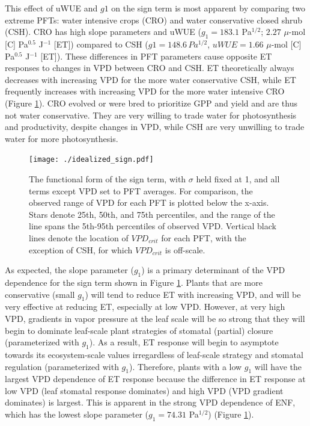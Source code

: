 \documentclass[draft,linenumbers]{agujournal}
\begin{document}
This effect of uWUE and $g1$ on the sign term is most apparent by comparing two extreme PFTs: water intensive crops (CRO) and water conservative closed shrub (CSH). CRO has high slope parameters and uWUE ($g_1 = 183.1$ Pa$^{1/2}$; $2.27$ $\mu$-mol [C] Pa$^{0.5}$ J$^{-1}$ [ET]) compared to CSH ($g1 = 148.6 \, Pa^{1/2}$, $uWUE=1.66$ $\mu$-mol [C] Pa$^{0.5}$ J$^{-1}$ [ET]). These differences in PFT parameters cause opposite ET responses to changes in VPD between CRO and CSH. ET theoretically always decreases with increasing VPD for the more water conservative CSH, while ET frequently  increases with increasing VPD for the more water intensive CRO (Figure \ref{idealized_sign}). CRO evolved or were bred to prioritize GPP and yield and are thus not water conservative. They are very willing to trade water for photosynthesis and productivity, despite changes in VPD, while CSH are very unwilling to trade water for more photosynthesis.

\begin{figure}
\centering
\texttt{[image: ./idealized\_sign.pdf]}
\caption{The functional form of the sign term, with $\sigma$ held fixed at 1, and all terms except VPD set to PFT averages. For comparison, the observed range of VPD for each PFT is plotted below the x-axis. Stars denote 25th, 50th, and 75th percentiles, and the range of the line spans the 5th-95th percentiles of observed VPD. Vertical black lines denote the location of $VPD_{crit}$ for each PFT, with the exception of CSH, for which $VPD_{crit}$ is off-scale.}
\label{idealized_sign}
\end{figure}


As expected, the slope parameter ($g_1$) is a primary determinant of the VPD dependence for the sign term shown in Figure \ref{idealized_sign}. Plants that are more conservative (small $g_1$) will tend to reduce ET with increasing VPD, and will be very effective at reducing ET, especially at low VPD. However, at very high VPD, gradients in vapor pressure at the leaf scale will be so strong that they will begin to dominate leaf-scale plant strategies of stomatal (partial) closure (parameterized with $g_1$). As a result, ET response will begin to asymptote towards its ecosystem-scale values irregardless of leaf-scale strategy and stomatal regulation (parameterized with $g_1$). Therefore, plants with a low $g_1$ will have the largest VPD dependence of ET response because the difference in ET response at low VPD (leaf stomatal response dominates) and high VPD (VPD gradient dominates) is largest. This is apparent in the strong VPD dependence of ENF, which has the lowest slope parameter ($g_1=74.31$ Pa$^{1/2}$) (Figure \ref{idealized_sign}).
\end{document}
